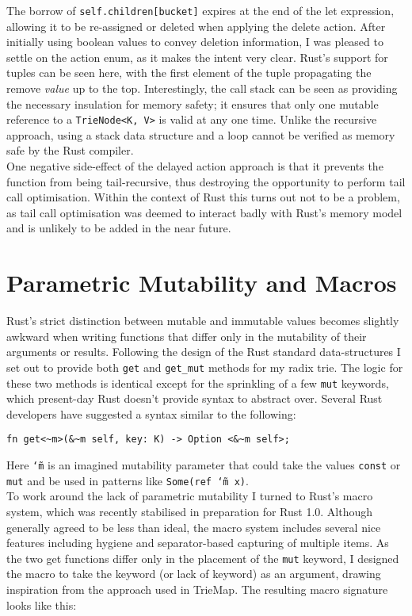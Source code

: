 \documentclass[a4paper,12pt]{article}
\newcommand{\code}{\texttt}
\newcommand{\tildex}{\char`\~}
\begin{document}
The borrow of \code{self.children[bucket]} expires at the end of the let expression, allowing it to be re-assigned or deleted when applying the delete action. After initially using boolean values to convey deletion information, I was pleased to settle on the action enum, as it makes the intent very clear. Rust's support for tuples can be seen here, with the first element of the tuple propagating the remove \textit{value} up to the top. Interestingly, the call stack can be seen as providing the necessary insulation for memory safety; it ensures that only one mutable reference to a \code{TrieNode<K, V>} is valid at any one time. Unlike the recursive approach, using a stack data structure and a loop cannot be verified as memory safe by the Rust compiler.\\

One negative side-effect of the delayed action approach is that it prevents the function from being tail-recursive, thus destroying the opportunity to perform tail call optimisation. Within the context of Rust this turns out not to be a problem, as tail call optimisation was deemed to interact badly with Rust's memory model and is unlikely to be added in the near future.

\section{Parametric Mutability and Macros}

Rust's strict distinction between mutable and immutable values becomes slightly awkward when writing functions that differ only in the mutability of their arguments or results. Following the design of the Rust standard data-structures I set out to provide both \code{get} and \code{get\_mut} methods for my radix trie. The logic for these two methods is identical except for the sprinkling of a few \code{mut} keywords, which present-day Rust doesn't provide syntax to abstract over. Several Rust developers have suggested a syntax similar to the following:

\begin{verbatim}
fn get<~m>(&~m self, key: K) -> Option <&~m self>;
\end{verbatim}

Here \code{\tildex m} is an imagined mutability parameter that could take the values \code{const} or \code{mut} and be used in patterns like \code{Some(ref \tildex m x)}.\\

To work around the lack of parametric mutability I turned to Rust's macro system, which was recently stabilised in preparation for Rust 1.0. Although generally agreed to be less than ideal, the macro system includes several nice features including hygiene and separator-based capturing of multiple items. As the two get functions differ only in the placement of the \code{mut} keyword, I designed the macro to take the keyword (or lack of keyword) as an argument, drawing inspiration from the approach used in TrieMap. The resulting macro signature looks like this:
\end{document}

